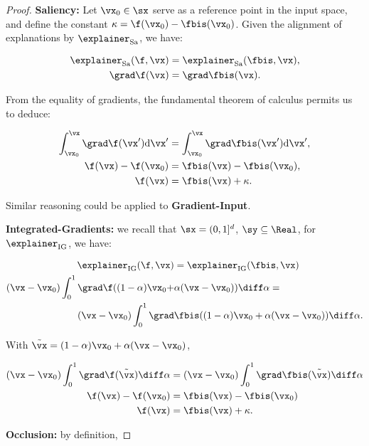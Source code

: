 \begin{proof}


\textbf{Saliency:} Let $\vx_0 \in \sx$ serve as a reference point in the input space, and define the constant $\kappa = \f(\vx_0) - \fbis(\vx_0)$. Given the alignment of explanations by $\explainer_{\text{Sa}}$, we have:

\begin{align}
\explainer_{\text{Sa}}(\f, \vx) &= \explainer_{\text{Sa}}(\fbis, \vx), \\
 \grad \f(\vx) &= \grad \fbis(\vx).
\end{align}

From the equality of gradients, the fundamental theorem of calculus permits us to deduce:

\begin{align}
\int_{\vx_0}^{\vx} \grad \f(\vx') \mathrm{d} \vx' &= \int_{\vx_0}^{\vx} \grad \fbis(\vx') \mathrm{d} \vx', \\
 \f(\vx) - \f(\vx_0) &= \fbis(\vx) - \fbis(\vx_0), \\
 \f(\vx) &= \fbis(\vx) + \kappa.
\end{align}

Similar reasoning could be applied to \textbf{Gradient-Input}.


\textbf{Integrated-Gradients:} we recall that $\sx = (0, 1]^d$, $\sy \subseteq \Real$, for $\explainer_{\text{IG}}$, we have:

\begin{align}
\explainer_{\text{IG}}(\f, \vx) &= \explainer_{\text{IG}}(\fbis, \vx) \\
(\vx - \vx_0) \int_{0}^{1} \grad \f((1 - \alpha) \vx_0 + &\alpha(\vx - \vx_0)) \diff \alpha = \\
(\vx - \vx_0) \int_{0}^{1} \grad & \fbis((1 - \alpha) \vx_0 + \alpha(\vx - \vx_0)) \diff \alpha.
\end{align}

With $\tilde{\vx} = (1 - \alpha) \vx_0 + \alpha(\vx - \vx_0)$, 

\begin{align}
(\vx - \vx_0) \int_{0}^{1} \grad \f(\tilde{\vx}) \diff \alpha &= 
(\vx - \vx_0) \int_{0}^{1} \grad  \fbis(\tilde{\vx}) \diff \alpha \\
\f(\vx) - \f(\vx_0) &= \fbis(\vx) - \fbis(\vx_0) \\
\f(\vx) &= \fbis(\vx) + \kappa.
\end{align}


\textbf{Occlusion:} by definition,


\end{proof}
